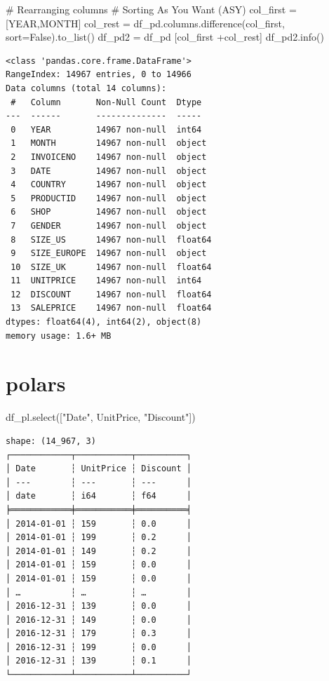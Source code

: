 \documentclass[
  letterpaper,
  DIV=11,
  numbers=noendperiod]{scrreprt}
\newenvironment{Shaded}{\begin{snugshade}}{\end{snugshade}}
\newcommand{\CommentTok}[1]{\textcolor[rgb]{0.37,0.37,0.37}{#1}}
\newcommand{\NormalTok}[1]{\textcolor[rgb]{0.00,0.23,0.31}{#1}}
\newcommand{\OperatorTok}[1]{\textcolor[rgb]{0.37,0.37,0.37}{#1}}
\newcommand{\StringTok}[1]{\textcolor[rgb]{0.13,0.47,0.30}{#1}}
\newcommand{\VariableTok}[1]{\textcolor[rgb]{0.07,0.07,0.07}{#1}}
\begin{document}
\begin{Shaded}
\begin{Highlighting}[]
\CommentTok{\# Rearranging columns }
\CommentTok{\# Sorting As You Want (ASY)}
\NormalTok{col\_first }\OperatorTok{=}\NormalTok{ [}\StringTok{\textquotesingle{}YEAR\textquotesingle{}}\NormalTok{,}\StringTok{\textquotesingle{}MONTH\textquotesingle{}}\NormalTok{]}
\NormalTok{col\_rest }\OperatorTok{=}\NormalTok{ df\_pd.columns.difference(col\_first, sort}\OperatorTok{=}\VariableTok{False}\NormalTok{).to\_list()}
\NormalTok{df\_pd2 }\OperatorTok{=}\NormalTok{ df\_pd [col\_first }\OperatorTok{+}\NormalTok{col\_rest]}
\NormalTok{df\_pd2.info()}
\end{Highlighting}
\end{Shaded}

\begin{verbatim}
<class 'pandas.core.frame.DataFrame'>
RangeIndex: 14967 entries, 0 to 14966
Data columns (total 14 columns):
 #   Column       Non-Null Count  Dtype  
---  ------       --------------  -----  
 0   YEAR         14967 non-null  int64  
 1   MONTH        14967 non-null  object 
 2   INVOICENO    14967 non-null  object 
 3   DATE         14967 non-null  object 
 4   COUNTRY      14967 non-null  object 
 5   PRODUCTID    14967 non-null  object 
 6   SHOP         14967 non-null  object 
 7   GENDER       14967 non-null  object 
 8   SIZE_US      14967 non-null  float64
 9   SIZE_EUROPE  14967 non-null  object 
 10  SIZE_UK      14967 non-null  float64
 11  UNITPRICE    14967 non-null  int64  
 12  DISCOUNT     14967 non-null  float64
 13  SALEPRICE    14967 non-null  float64
dtypes: float64(4), int64(2), object(8)
memory usage: 1.6+ MB
\end{verbatim}

\section{polars}

\begin{Shaded}
\begin{Highlighting}[]
\NormalTok{df\_pl.select([}\StringTok{"Date"}\NormalTok{, }\StringTok{\textquotesingle{}UnitPrice\textquotesingle{}}\NormalTok{, }\StringTok{"Discount"}\NormalTok{])}
\end{Highlighting}
\end{Shaded}

\begin{verbatim}
shape: (14_967, 3)
┌────────────┬───────────┬──────────┐
│ Date       ┆ UnitPrice ┆ Discount │
│ ---        ┆ ---       ┆ ---      │
│ date       ┆ i64       ┆ f64      │
╞════════════╪═══════════╪══════════╡
│ 2014-01-01 ┆ 159       ┆ 0.0      │
│ 2014-01-01 ┆ 199       ┆ 0.2      │
│ 2014-01-01 ┆ 149       ┆ 0.2      │
│ 2014-01-01 ┆ 159       ┆ 0.0      │
│ 2014-01-01 ┆ 159       ┆ 0.0      │
│ …          ┆ …         ┆ …        │
│ 2016-12-31 ┆ 139       ┆ 0.0      │
│ 2016-12-31 ┆ 149       ┆ 0.0      │
│ 2016-12-31 ┆ 179       ┆ 0.3      │
│ 2016-12-31 ┆ 199       ┆ 0.0      │
│ 2016-12-31 ┆ 139       ┆ 0.1      │
└────────────┴───────────┴──────────┘
\end{verbatim}
\end{document}
